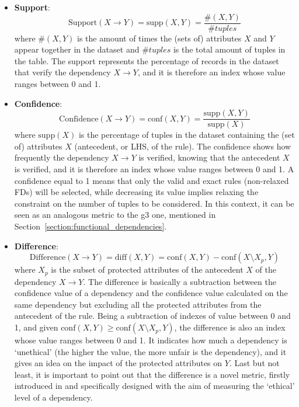 \begin{itemize}
\item \textbf{Support}: \[\mathrm{Support}(X \rightarrow Y) = \mathrm{supp}(X, Y) = \frac{\#(X, Y)}{\mathit{\#tuples}}\] where \(\#(X, Y)\) is the amount of times the (sets of) attributes \(X\) and \(Y\) appear together in the dataset and \(\#tuples\) is the total amount of tuples in the table. The support represents the percentage of records in the dataset that verify the dependency \(X \rightarrow Y\), and it is therefore an index whose value ranges between 0 and 1.
\item \textbf{Confidence}: \[\mathrm{Confidence}(X \rightarrow Y) = \mathrm{conf}(X, Y) = \frac{\mathrm{supp}(X, Y)}{\mathrm{supp}(X)}\] where \(\mathrm{supp}(X)\) is the percentage of tuples in the dataset containing the (set of) attributes \(X\) (antecedent, or LHS, of the rule). The confidence shows how frequently the dependency \(X \rightarrow Y\) is verified, knowing that the antecedent \(X\) is verified, and it is therefore an index whose value ranges between 0 and 1. A confidence equal to 1 means that only the valid and exact rules (non-relaxed FDs) will be selected, while decreasing its value implies relaxing the constraint on the number of tuples to be considered. In this context, it can be seen as an analogous metric to the g3 one, mentioned in Section~\ref{section:functional_dependencies}.
\item \textbf{Difference}: \[\mathrm{Difference}(X \rightarrow Y) = \mathrm{diff}(X, Y) = \mathrm{conf}(X, Y) - \mathrm{conf}(X \setminus X_p, Y)\] where \(X_p\) is the subset of protected attributes of the antecedent \(X\) of the dependency \(X \rightarrow Y\). The difference is basically a subtraction between the confidence value of a dependency and the confidence value calculated on the same dependency but excluding all the protected attributes from the antecedent of the rule. Being a subtraction of indexes of value between 0 and 1, and given \(\mathrm{conf}(X, Y) \geq \mathrm{conf}(X \setminus X_p, Y)\), the difference is also an index whose value ranges between 0 and 1. It indicates how much a dependency is `unethical' (the higher the value, the more unfair is the dependency), and it gives an idea on the impact of the protected attributes on \(Y\). Last but not least, it is important to point out that the difference is a novel metric, firstly introduced in \cite{azzalini2021fair} and specifically designed with the aim of measuring the `ethical' level of a dependency.
\end{itemize}


